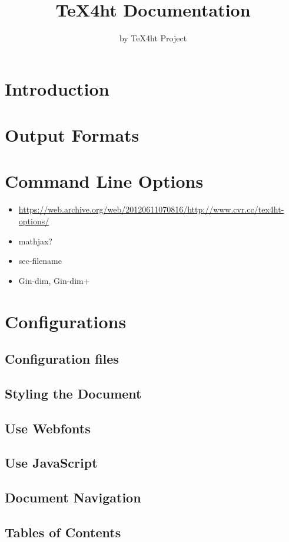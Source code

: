 \documentclass{book}
\title{TeX4ht Documentation}
\author{by TeX4ht Project}
\begin{document}
\maketitle
\tableofcontents


\chapter{Introduction}

\chapter{Output Formats}
\chapter{Command Line Options}

\begin{itemize}
  \item \url{https://web.archive.org/web/20120611070816/http://www.cvr.cc/tex4ht-options/}
  \item mathjax?
  \item sec-filename
  \item Gin-dim, Gin-dim+
\end{itemize}

\chapter{Configurations}
\section{Configuration files}
\section{Styling the Document}
\section{Use Webfonts}
\section{Use JavaScript}
\section{Document Navigation}
\section{Tables of Contents}
\end{document}
